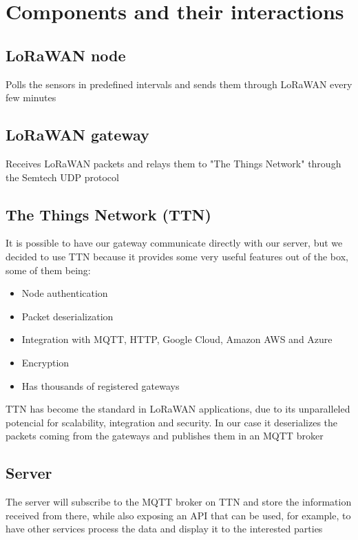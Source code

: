 \section{Components and their interactions}


	\subsection{LoRaWAN node}
		Polls the sensors in predefined intervals and sends them through LoRaWAN every few minutes

	\subsection{LoRaWAN gateway}
		Receives LoRaWAN packets and relays them to "The Things Network" through the Semtech UDP protocol

	\subsection{The Things Network (TTN)}
		It is possible to have our gateway communicate directly with our server, but we decided to use TTN because it provides some very useful features out of the box, some of them being:

		\begin{itemize}
			\item Node authentication
			\item Packet deserialization
			\item Integration with MQTT, HTTP, Google Cloud, Amazon AWS and Azure
			\item Encryption
			\item Has thousands of registered gateways
		\end{itemize}

		TTN has become the standard in LoRaWAN applications, due to its unparalleled potencial for scalability, integration and security. In our case it deserializes the packets coming from the gateways and publishes them in an MQTT broker 

	\subsection{Server}
		The server will subscribe to the MQTT broker on TTN and store the information received from there, while also exposing an API that can be used, for example, to have other services process the data and display it to the interested parties

